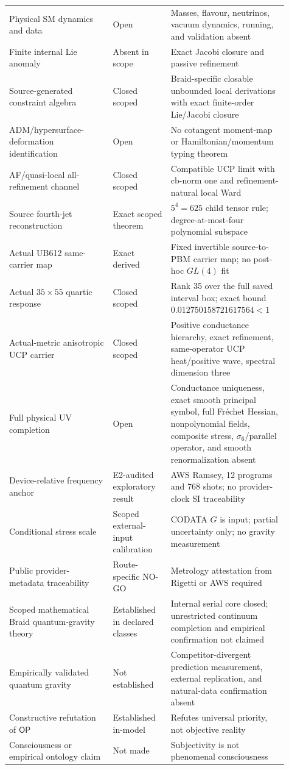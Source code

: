 \documentclass[11pt]{article}
\theoremstyle{definition}
\theoremstyle{remark}
\newcommand{\OPT}{\mathsf{OP}}
\begin{document}
\begin{longtable}{>{\raggedright\arraybackslash}p{0.34\linewidth} >{\raggedright\arraybackslash}p{0.19\linewidth} >{\raggedright\arraybackslash}p{0.38\linewidth}}
Physical SM dynamics and data & Open & Masses, flavour, neutrinos, vacuum dynamics, running, and validation absent \\
Finite internal Lie anomaly & Absent in scope & Exact Jacobi closure and passive refinement \\
Source-generated constraint algebra & Closed scoped & Braid-specific closable unbounded local derivations with exact finite-order Lie/Jacobi closure \\
ADM/hypersurface-deformation identification & Open & No cotangent moment-map or Hamiltonian/momentum typing theorem \\
AF/quasi-local all-refinement channel & Closed scoped & Compatible UCP limit with cb-norm one and refinement-natural local Ward \\
Source fourth-jet reconstruction & Exact scoped theorem & $5^4=625$ child tensor rule; degree-at-most-four polynomial subspace \\
Actual UB612 same-carrier map & Exact derived & Fixed invertible source-to-PBM carrier map; no post-hoc $GL(4)$ fit \\
Actual $35\times55$ quartic response & Closed scoped & Rank 35 over the full saved interval box; exact bound $0.012750158721617564<1$ \\
Actual-metric anisotropic UCP carrier & Closed scoped & Positive conductance hierarchy, exact refinement, same-operator UCP heat/positive wave, spectral dimension three \\
Full physical UV completion & Open & Conductance uniqueness, exact smooth principal symbol, full Fr\'echet Hessian, nonpolynomial fields, composite stress, $\sigma_6$/parallel operator, and smooth renormalization absent \\
Device-relative frequency anchor & E2-audited exploratory result & AWS Ramsey, 12 programs and 768 shots; no provider-clock SI traceability \\
Conditional stress scale & Scoped external-input calibration & CODATA $G$ is input; partial uncertainty only; no gravity measurement \\
Public provider-metadata traceability & Route-specific NO-GO & Metrology attestation from Rigetti or AWS required \\
Scoped mathematical Braid quantum-gravity theory & Established in declared classes & Internal serial core closed; unrestricted continuum completion and empirical confirmation not claimed \\
Empirically validated quantum gravity & Not established & Competitor-divergent prediction measurement, external replication, and natural-data confirmation absent \\
Constructive refutation of $\OPT$ & Established in-model & Refutes universal priority, not objective reality \\
Consciousness or empirical ontology claim & Not made & Subjectivity is not phenomenal consciousness \\
\bottomrule
\end{longtable}
\end{document}
